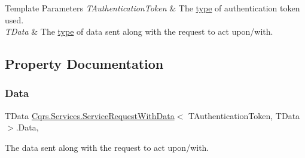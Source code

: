 \begin{DoxyTemplParams}{Template Parameters}
{\em T\+Authentication\+Token} & The \hyperlink{}{type} of authentication token used.\\
\hline
{\em T\+Data} & The \hyperlink{}{type} of data sent along with the request to act upon/with.\\
\hline
\end{DoxyTemplParams}


\subsection{Property Documentation}
\mbox{\label{classCqrs_1_1Services_1_1ServiceRequestWithData_aab0d15e170d06c7170be934f9705937b_aab0d15e170d06c7170be934f9705937b}} 
\subsubsection{\texorpdfstring{Data}{Data}}
{\footnotesize\ttfamily T\+Data \hyperlink{classCqrs_1_1Services_1_1ServiceRequestWithData}{Cqrs.\+Services.\+Service\+Request\+With\+Data}$<$ T\+Authentication\+Token, T\+Data $>$.Data\hspace{0.3cm}{\ttfamily [get]}, {\ttfamily [set]}}



The data sent along with the request to act upon/with. 

